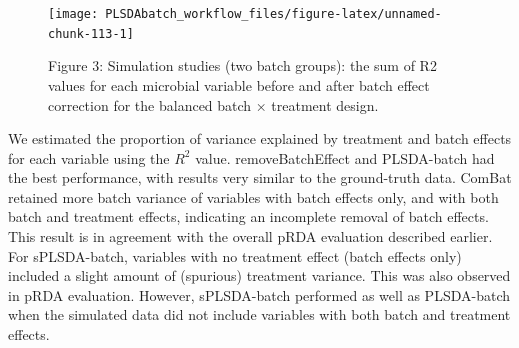 \documentclass[
]{book}
\begin{document}
\begin{figure}

{\centering \texttt{[image: PLSDAbatch\_workflow\_files/figure-latex/unnamed-chunk-113-1]} 

}

\caption{Figure 3: Simulation studies (two batch groups): the sum of R2 values for each microbial variable before and after batch effect correction for the balanced batch × treatment design.}\label{fig:unnamed-chunk-113}
\end{figure}

We estimated the proportion of variance explained by treatment and batch effects for each variable using the \(R^2\) value. removeBatchEffect and PLSDA-batch had the best performance, with results very similar to the ground-truth data. ComBat retained more batch variance of variables with batch effects only, and with both batch and treatment effects, indicating an incomplete removal of batch effects. This result is in agreement with the overall pRDA evaluation described earlier. For sPLSDA-batch, variables with no treatment effect (batch effects only) included a slight amount of (spurious) treatment variance. This was also observed in pRDA evaluation. However, sPLSDA-batch performed as well as PLSDA-batch when the simulated data did not include variables with both batch and treatment effects.
\end{document}
